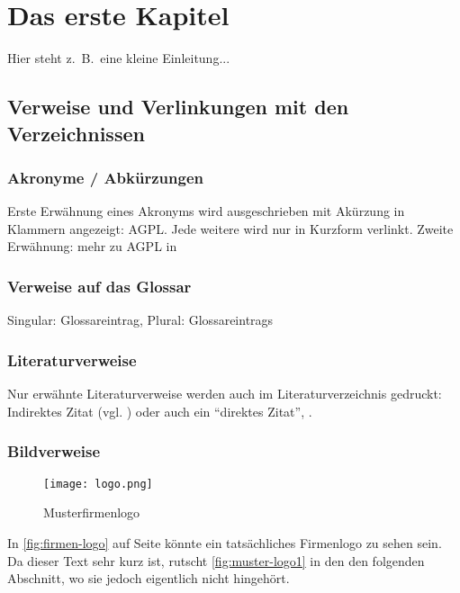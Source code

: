 
\chapter{Das erste Kapitel}
Hier steht z.\ B.\ eine kleine Einleitung...
\section{Verweise und Verlinkungen mit den Verzeichnissen}
\subsection{Akronyme / Abkürzungen}
Erste Erwähnung eines Akronyms wird ausgeschrieben mit Akürzung in Klammern angezeigt: \ac{AGPL}. Jede weitere wird nur in Kurzform verlinkt. Zweite Erwähnung: mehr zu \ac{AGPL} in \cite{fsf:2007}

\subsection{Verweise auf das Glossar}
Singular: \gls{Glossareintrag}, Plural: \glspl{Glossareintrag}

\subsection{Literaturverweise}
Nur erwähnte Literaturverweise werden auch im Literaturverzeichnis gedruckt:\\
Indirektes Zitat (vgl. \cite{baumgartner:2002}) oder auch ein ``direktes Zitat'', \cite{dreyfus:1980}.
\paragraph{}

\subsection{Bildverweise}
\begin{wrapfigure}{R}{.4\textwidth}
\centering
\texttt{[image: logo.png]}
\vspace{-15pt}
\caption{Musterfirmenlogo \cite{mustermann:2012}}
\label{fig:muster-logo1}
\end{wrapfigure}
In \autoref{fig:firmen-logo} auf Seite \pageref{fig:firmen-logo} könnte ein tatsächliches Firmenlogo zu sehen sein. Da dieser Text sehr kurz ist, rutscht \autoref{fig:muster-logo1} in den den folgenden Abschnitt, wo sie jedoch eigentlich nicht hingehört.


